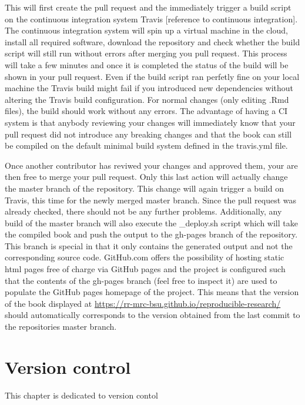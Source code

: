 \documentclass[]{book}
\begin{document}
This will first create the pull request and the immediately trigger a
build script on the continuous integration system Travis {[}reference to
continuous integration{]}. The continuous integration system will spin
up a virtual machine in the cloud, install all required software,
download the repository and check whether the build script will still
run without errors after merging you pull request. This process will
take a few minutes and once it is completed the status of the build will
be shown in your pull request. Even if the build script ran perfetly
fine on your local machine the Travis build might fail if you introduced
new dependencies without altering the Travis build configuration. For
normal changes (only editing .Rmd files), the build should work without
any errors. The advantage of having a CI system is that anybody
reviewing your changes will immediately know that your pull request did
not introduce any breaking changes and that the book can still be
compiled on the default minimal build system defined in the travis.yml
file.

Once another contributor has reviwed your changes and approved them,
your are then free to merge your pull request. Only this last action
will actually change the master branch of the repository. This change
will again trigger a build on Travis, this time for the newly merged
master branch. Since the pull request was already checked, there should
not be any further problems. Additionally, any build of the master
branch will also execute the \_deploy.sh script which will take the
compiled book and push the output to the gh-pages branch of the
repository. This branch is special in that it only contains the
generated output and not the corresponding source code. GitHub.com
offers the possibility of hosting static html pages free of charge via
GitHub pages and the project is configured such that the contents of the
gh-pages branch (feel free to inspect it) are used to populate the
GitHub pages homepage of the project. This means that the version of the
book displayed at
\url{https://rr-mrc-bsu.github.io/reproducible-research/} should
automatically corresponds to the version obtained from the last commit
to the repositories master branch.

\chapter{Version control}\label{version-control}

This chapter is dedicated to version contol
\end{document}
